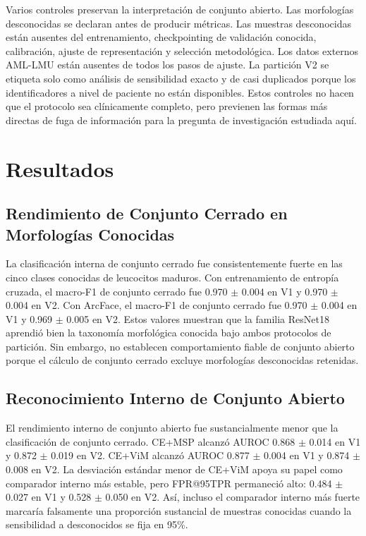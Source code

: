 \documentclass[11pt]{article}
\begin{document}
Varios controles preservan la interpretación de conjunto abierto. Las morfologías desconocidas se declaran antes de producir métricas. Las muestras desconocidas están ausentes del entrenamiento, checkpointing de validación conocida, calibración, ajuste de representación y selección metodológica. Los datos externos AML-LMU están ausentes de todos los pasos de ajuste. La partición V2 se etiqueta solo como análisis de sensibilidad exacto y de casi duplicados porque los identificadores a nivel de paciente no están disponibles. Estos controles no hacen que el protocolo sea clínicamente completo, pero previenen las formas más directas de fuga de información para la pregunta de investigación estudiada aquí.

\section{Resultados}

\subsection{Rendimiento de Conjunto Cerrado en Morfologías Conocidas}

La clasificación interna de conjunto cerrado fue consistentemente fuerte en las cinco clases conocidas de leucocitos maduros. Con entrenamiento de entropía cruzada, el macro-F1 de conjunto cerrado fue 0.970 $\pm$ 0.004 en V1 y 0.970 $\pm$ 0.004 en V2. Con ArcFace, el macro-F1 de conjunto cerrado fue 0.970 $\pm$ 0.004 en V1 y 0.969 $\pm$ 0.005 en V2. Estos valores muestran que la familia ResNet18 aprendió bien la taxonomía morfológica conocida bajo ambos protocolos de partición. Sin embargo, no establecen comportamiento fiable de conjunto abierto porque el cálculo de conjunto cerrado excluye morfologías desconocidas retenidas.

\subsection{Reconocimiento Interno de Conjunto Abierto}

El rendimiento interno de conjunto abierto fue sustancialmente menor que la clasificación de conjunto cerrado. CE+MSP alcanzó AUROC 0.868 $\pm$ 0.014 en V1 y 0.872 $\pm$ 0.019 en V2. CE+ViM alcanzó AUROC 0.877 $\pm$ 0.004 en V1 y 0.874 $\pm$ 0.008 en V2. La desviación estándar menor de CE+ViM apoya su papel como comparador interno más estable, pero FPR@95TPR permaneció alto: 0.484 $\pm$ 0.027 en V1 y 0.528 $\pm$ 0.050 en V2. Así, incluso el comparador interno más fuerte marcaría falsamente una proporción sustancial de muestras conocidas cuando la sensibilidad a desconocidos se fija en 95\%.
\end{document}
